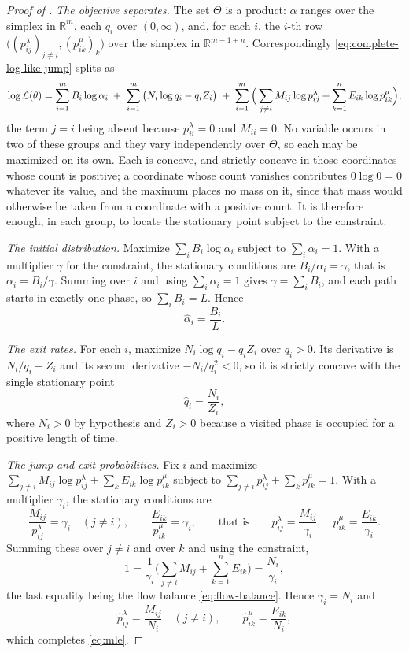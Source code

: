 \documentclass{article}
\newcommand{\R}{\mathbb{R}}
\begin{document}
\begin{proof}[Proof of ]
\emph{The objective separates.} The set $\Theta$ is a product: $\alpha$ ranges over the simplex in
$\R^m$, each $q_i$ over $(0,\infty)$, and, for each $i$, the $i$-th row
$\big((p^\lambda_{ij})_{j\neq i},(p^\mu_{ik})_k\big)$ over the simplex in $\R^{m-1+n}$.
Correspondingly \eqref{eq:complete-log-like-jump} splits as
%
\[
\log{\cal L}(\theta)
=
\sum_{i=1}^m B_i\log\alpha_i
\;+\;
\sum_{i=1}^m \big( N_i\log q_i - q_i Z_i \big)
\;+\;
\sum_{i=1}^m \Big( \sum_{j \neq i} M_{ij}\log p^\lambda_{ij} + \sum_{k=1}^n E_{ik}\log p^\mu_{ik} \Big),
\]
%
the term $j=i$ being absent because $p^\lambda_{ii}=0$ and $M_{ii}=0$. No variable occurs in two of
these groups and they vary independently over $\Theta$, so each may be maximized on its own. Each is
concave, and strictly concave in those coordinates whose count is positive; a coordinate whose count
vanishes contributes $0\log 0 = 0$ whatever its value, and the maximum places no mass on it, since
that mass would otherwise be taken from a coordinate with a positive count. It is therefore enough,
in each group, to locate the stationary point subject to the constraint.

\emph{The initial distribution.} Maximize $\sum_i B_i\log\alpha_i$ subject to $\sum_i \alpha_i=1$.
With a multiplier $\gamma$ for the constraint, the stationary conditions are
$B_i/\alpha_i = \gamma$, that is $\alpha_i = B_i/\gamma$. Summing over $i$ and using
$\sum_i \alpha_i = 1$ gives $\gamma = \sum_i B_i$, and each path starts in exactly one phase, so
$\sum_i B_i = L$. Hence
%
\[
\hat\alpha_i = \frac{B_i}{L}.
\]

\emph{The exit rates.} For each $i$, maximize $N_i\log q_i - q_i Z_i$ over $q_i>0$. Its derivative is
$N_i/q_i - Z_i$ and its second derivative $-N_i/q_i^2<0$, so it is strictly concave with the single
stationary point
%
\[
\hat q_i = \frac{N_i}{Z_i},
\]
%
where $N_i>0$ by hypothesis and $Z_i>0$ because a visited phase is occupied for a positive length of
time.

\emph{The jump and exit probabilities.} Fix $i$ and maximize
$\sum_{j\neq i} M_{ij}\log p^\lambda_{ij} + \sum_k E_{ik}\log p^\mu_{ik}$ subject to
$\sum_{j \neq i} p^\lambda_{ij} + \sum_k p^\mu_{ik} = 1$. With a multiplier $\gamma_i$, the
stationary conditions are
%
\[
\frac{M_{ij}}{p^\lambda_{ij}} = \gamma_i \quad (j \neq i),
\qquad
\frac{E_{ik}}{p^\mu_{ik}} = \gamma_i ,
\qquad\text{that is}\qquad
p^\lambda_{ij} = \frac{M_{ij}}{\gamma_i},
\quad
p^\mu_{ik} = \frac{E_{ik}}{\gamma_i} .
\]
%
Summing these over $j \neq i$ and over $k$ and using the constraint,
%
\[
1 = \frac{1}{\gamma_i}\Big( \sum_{j \neq i} M_{ij} + \sum_{k=1}^n E_{ik} \Big) = \frac{N_i}{\gamma_i},
\]
%
the last equality being the flow balance \eqref{eq:flow-balance}. Hence $\gamma_i = N_i$ and
%
\[
\hat p^\lambda_{ij} = \frac{M_{ij}}{N_i} \quad (j \neq i),
\qquad
\hat p^\mu_{ik} = \frac{E_{ik}}{N_i},
\]
%
which completes \eqref{eq:mle}.


\end{proof}
\end{document}
